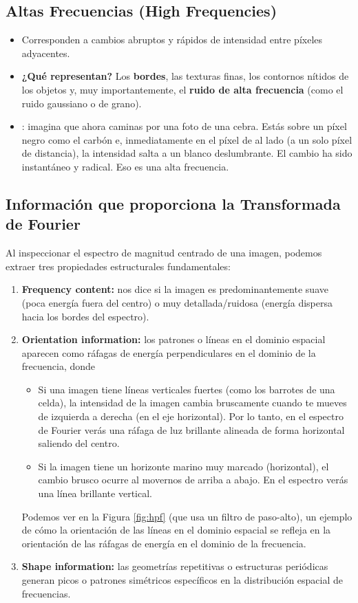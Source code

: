 \subsection{Altas Frecuencias (High Frequencies)}
\begin{itemize}
    \item Corresponden a cambios abruptos y rápidos de intensidad entre píxeles adyacentes.
    \item \textbf{¿Qué representan?} Los \textbf{bordes}, las texturas finas, los contornos nítidos de los objetos y, muy importantemente, el \textbf{ruido de alta frecuencia} (como el ruido gaussiano o de grano).
    \item {}: imagina que ahora caminas por una foto de una cebra. Estás sobre un píxel negro como el carbón e, inmediatamente en el píxel de al lado (a un solo píxel de distancia), la intensidad salta a un blanco deslumbrante. El cambio ha sido instantáneo y radical. Eso es una alta frecuencia.

\end{itemize}

\subsection{Información que proporciona la Transformada de Fourier}
\noindent
Al inspeccionar el espectro de magnitud centrado de una imagen, podemos extraer tres propiedades estructurales fundamentales:
\begin{enumerate}
    \item \textbf{Frequency content:} nos dice si la imagen es predominantemente suave (poca energía fuera del centro) o muy detallada/ruidosa (energía dispersa hacia los bordes del espectro).
    \item \textbf{Orientation information:} los patrones o líneas en el dominio espacial aparecen como ráfagas de energía perpendiculares en el dominio de la frecuencia, donde
    \begin{itemize}
        \item Si una imagen tiene líneas verticales fuertes (como los barrotes de una celda), la intensidad de la imagen cambia bruscamente cuando te mueves de izquierda a derecha (en el eje horizontal). Por lo tanto, en el espectro de Fourier verás una ráfaga de luz brillante alineada de forma horizontal saliendo del centro.
        \item Si la imagen tiene un horizonte marino muy marcado (horizontal), el cambio brusco ocurre al movernos de arriba a abajo. En el espectro verás una línea brillante vertical.
    \end{itemize}
    Podemos ver en la Figura \ref{fig:hpf} (que usa un filtro de paso-alto), un ejemplo de cómo la orientación de las líneas en el dominio espacial se refleja en la orientación de las ráfagas de energía en el dominio de la frecuencia.
    
    \item \textbf{Shape information:} las geometrías repetitivas o estructuras periódicas generan picos o patrones simétricos específicos en la distribución espacial de frecuencias.
\end{enumerate}

